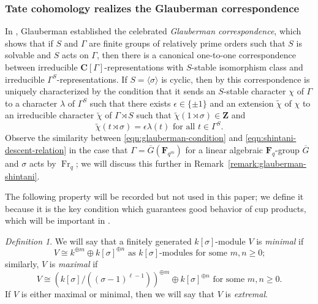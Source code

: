 \documentclass[reqno]{amsart}
\numberwithin{equation}{subsection}
\newcommand{\F}{\mathbf{F}}
\newcommand{\CC}{\mathbf{C}}
\newcommand{\wt}[1]{\widetilde{#1}}
\newcommand{\Z}{\mathbf{Z}}
\newcommand{\ol}[1]{\overline{#1}}
\DeclareMathOperator{\Fr}{Fr}
\theoremstyle{remark}
\newtheorem{defn}[thm]{Definition}
\numberwithin{equation}{subsection}
\numberwithin{figure}{subsection}
\begin{document}
\subsubsection{Tate cohomology realizes the Glauberman correspondence}  In \cite[Corollary~8]{Gla68}, Glauberman established the celebrated \emph{Glauberman correspondence}, which shows that if $S$ and $\Gamma$ are finite groups of relatively prime orders such that $S$ is solvable and $S$ acts on $\Gamma$, then there is a canonical one-to-one correspondence between irreducible $\CC[\Gamma]$-representations with $S$-stable isomorphism class and irreducible $\Gamma^S$-representations. If $S = \langle \sigma \rangle$ is cyclic, then by \cite[Theorem~3]{Gla68} this correspondence is uniquely characterized by the condition that it sends an $S$-stable character $\chi$ of $\Gamma$ to a character $\lambda$ of $\Gamma^S$ such that there exists $\epsilon \in \{\pm 1\}$ and an extension $\wt\chi$ of $\chi$ to an irreducible character $\wt\chi$ of $\Gamma \rtimes S$ such that $\wt\chi(1 \rtimes \sigma) \in \Z$ and
\begin{equation}\label{eqn:glauberman-condition}
    \wt\chi(t \rtimes \sigma) = \epsilon\lambda(t) \text{ for all } t \in \Gamma^S.
\end{equation}
Observe the similarity between \eqref{eqn:glauberman-condition} and \eqref{eqn:shintani-descent-relation} in the case that $\Gamma = \ol G(\F_{q^m})$ for a linear algebraic $\F_q$-group $\ol G$ and $\sigma$ acts by $\Fr_q$; we will discuss this further in Remark~\ref{remark:glauberman-shintani}.

The following property will be recorded but not used in this paper; we define it because it is the key condition which guarantees good behavior of cup products, which will be important in \cite{CF26b}.

\begin{defn}\label{def:extremal}
    We will say that a finitely generated $k[\sigma]$-module $V$ is \emph{minimal} if 
    \[
    \text{$V \cong k^{\oplus m} \oplus k[\sigma]^{\oplus n}$ as $k[\sigma]$-modules for some $m, n \geq 0$;}
    \]
    similarly, $V$ is \emph{maximal} if 
    \[
    \text{$V \cong (k[\sigma]/((\sigma-1)^{\ell-1}))^{\oplus m} \oplus k[\sigma]^{\oplus n}$ for some $m, n \geq 0$.}
    \]
    If $V$ is either maximal or minimal, then we will say that $V$ is \emph{extremal}.
\end{defn}
\end{document}

